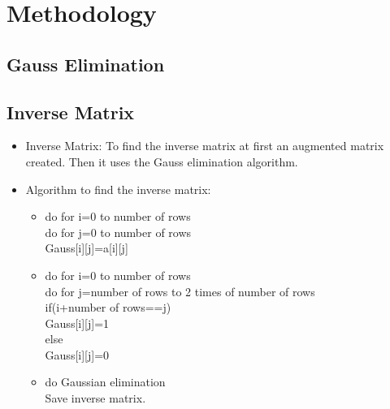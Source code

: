 \documentclass[12pt]{beamer}
\begin{document}
	\section{Methodology}
	\subsection{Gauss Elimination}
	\begin{frame}
\begin{algorithm}[H]
        
 
	    		  \end{algorithm}	
		
			\end{frame}
		
	
\subsection{Inverse Matrix}
\begin{frame}
\begin{itemize}
\item Inverse Matrix:
To find the inverse matrix at first an augmented matrix created. Then it uses the Gauss elimination algorithm.\\
\item Algorithm to find the inverse matrix:
\begin{itemize} 
\item do for i=0 to number of rows\\
 do for j=0 to number of rows\\
Gauss[i][j]=a[i][j] 
\item do for i=0 to number of rows \\
 do for j=number of rows to 2 times of number of rows\\
 if(i+number of rows==j)\\
Gauss[i][j]=1\\
else\\
Gauss[i][j]=0\\
\item do Gaussian elimination\\
Save inverse matrix.
\end{itemize}
\end{itemize}
\end{frame}
\end{document}
